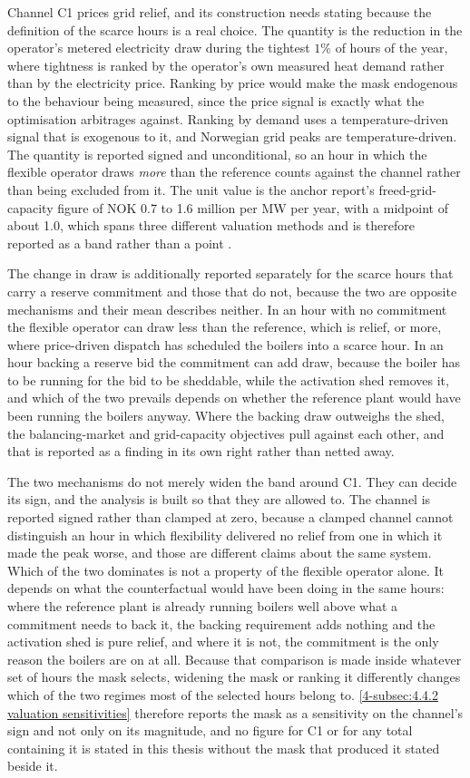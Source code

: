 Channel C1 prices grid relief, and its construction needs stating because the definition of the scarce hours is a real choice. The quantity is the reduction in the operator's metered electricity draw during the tightest $1\%$ of hours of the year, where tightness is ranked by the operator's own measured heat demand rather than by the electricity price. Ranking by price would make the mask endogenous to the behaviour being measured, since the price signal is exactly what the optimisation arbitrages against. Ranking by demand uses a temperature-driven signal that is exogenous to it, and Norwegian grid peaks are temperature-driven. The quantity is reported signed and unconditional, so an hour in which the flexible operator draws \emph{more} than the reference counts against the channel rather than being excluded from it. The unit value is the anchor report's freed-grid-capacity figure of NOK 0.7 to 1.6 million per MW per year, with a midpoint of about 1.0, which spans three different valuation methods and is therefore reported as a band rather than a point \cite{Thema_fjernvarme_2024}.

The change in draw is additionally reported separately for the scarce hours that carry a reserve commitment and those that do not, because the two are opposite mechanisms and their mean describes neither. In an hour with no commitment the flexible operator can draw less than the reference, which is relief, or more, where price-driven dispatch has scheduled the boilers into a scarce hour. In an hour backing a reserve bid the commitment can add draw, because the boiler has to be running for the bid to be sheddable, while the activation shed removes it, and which of the two prevails depends on whether the reference plant would have been running the boilers anyway. Where the backing draw outweighs the shed, the balancing-market and grid-capacity objectives pull against each other, and that is reported as a finding in its own right rather than netted away.

The two mechanisms do not merely widen the band around C1. They can decide its sign, and the analysis is built so that they are allowed to. The channel is reported signed rather than clamped at zero, because a clamped channel cannot distinguish an hour in which flexibility delivered no relief from one in which it made the peak worse, and those are different claims about the same system. Which of the two dominates is not a property of the flexible operator alone. It depends on what the counterfactual would have been doing in the same hours: where the reference plant is already running boilers well above what a commitment needs to back it, the backing requirement adds nothing and the activation shed is pure relief, and where it is not, the commitment is the only reason the boilers are on at all. Because that comparison is made inside whatever set of hours the mask selects, widening the mask or ranking it differently changes which of the two regimes most of the selected hours belong to. \autoref{4-subsec:4.4.2 valuation sensitivities} therefore reports the mask as a sensitivity on the channel's sign and not only on its magnitude, and no figure for C1 or for any total containing it is stated in this thesis without the mask that produced it stated beside it.

